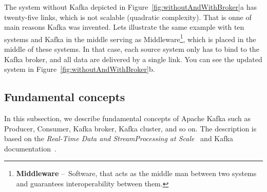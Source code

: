 The system without Kafka depicted in Figure~\ref{fig:withoutAndWithBroker}a has twenty-five links, which is not scalable (quadratic complexity).
That is onne of main reasons Kafka was invented.
Lets illustrate the same example with ten systems and Kafka in the middle serving as Middleware\footnote{\textbf{Middleware} \---\ Software, that acts as the middle man between two systems and guarantees interoperability between them.}, which is placed in the middle of these systems.
In that case, each source system only has to bind to the Kafka broker, and all data are delivered by a single link. You can see the updated system in Figure~\ref{fig:withoutAndWithBroker}b.

\subsection{Fundamental concepts}

In this subsection, we describe fundamental concepts of Apache Kafka such as Producer, Consumer, Kafka broker, Kafka cluster, and so on.
The description is based on the \emph{Real-Time Data and StreamProcessing at Scale}~\cite{apacheKafkaDefinitiveGuide} and Kafka documentation~\cite{kafkaDocumentation}.

